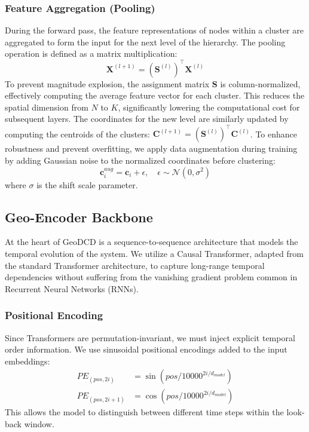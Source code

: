 \documentclass{article}
\begin{document}
\subsubsection{Feature Aggregation (Pooling)}
During the forward pass, the feature representations of nodes within a cluster are aggregated to form the input for the next level of the hierarchy. The pooling operation is defined as a matrix multiplication:
\begin{equation}
\mathbf{X}^{(l+1)} = (\mathbf{S}^{(l)})^\top \mathbf{X}^{(l)}
\end{equation}
To prevent magnitude explosion, the assignment matrix $\mathbf{S}$ is column-normalized, effectively computing the average feature vector for each cluster. This reduces the spatial dimension from $N$ to $K$, significantly lowering the computational cost for subsequent layers. The coordinates for the new level are similarly updated by computing the centroids of the clusters: $\mathbf{C}^{(l+1)} = (\mathbf{S}^{(l)})^\top \mathbf{C}^{(l)}$. To enhance robustness and prevent overfitting, we apply data augmentation during training by adding Gaussian noise to the normalized coordinates before clustering:
\begin{equation}
\mathbf{c}_i^{aug} = \mathbf{c}_i + \epsilon, \quad \epsilon \sim \mathcal{N}(0, \sigma^2)
\end{equation}
where $\sigma$ is the shift scale parameter.

\subsection{Geo-Encoder Backbone}
At the heart of GeoDCD is a sequence-to-sequence architecture that models the temporal evolution of the system. We utilize a Causal Transformer, adapted from the standard Transformer architecture, to capture long-range temporal dependencies without suffering from the vanishing gradient problem common in Recurrent Neural Networks (RNNs).
\subsubsection{Positional Encoding}
Since Transformers are permutation-invariant, we must inject explicit temporal order information. We use sinusoidal positional encodings added to the input embeddings:
\begin{align}
PE_{(pos, 2i)} &= \sin(pos / 10000^{2i/d_{model}}) \\
PE_{(pos, 2i+1)} &= \cos(pos / 10000^{2i/d_{model}})
\end{align}
This allows the model to distinguish between different time steps within the look-back window.
\end{document}
